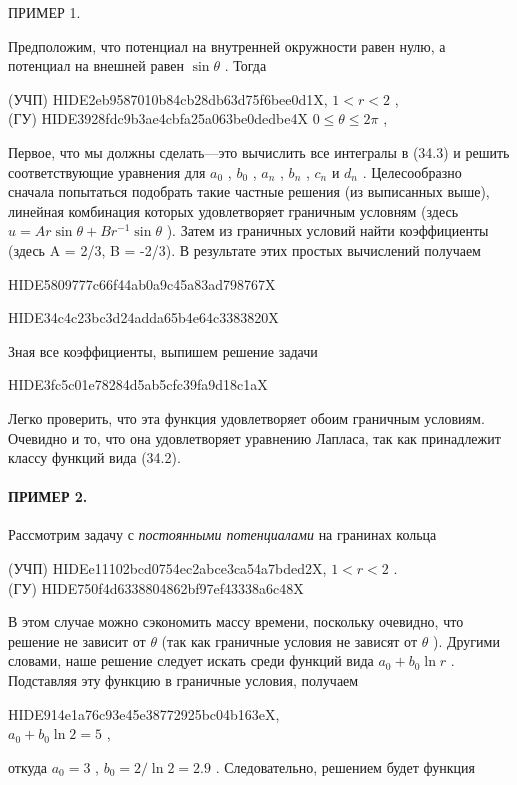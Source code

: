 \documentclass[
  ukrainian,
]{article}
\begin{document}
ПРИМЕР 1.

Предположим, что потенциал на внутренней окружности равен нулю, а
потенциал на внешней равен \(\sin\theta\) . Тогда

(УЧП) HIDE2eb9587010b84cb28db63d75f6bee0d1X, \(1 < r < 2\) ,\\
(ГУ) HIDE3928fdc9b3ae4cbfa25a063be0dedbe4X \(0 \le \theta \le 2\pi\) ,

Первое, что мы должны сделать---это вычислить все интегралы в (34.3) и
решить соответствующие уравнения для \(a_0\) , \(b_0\) , \(a_n\) ,
\(b_n\) , \(c_n\) и \(d_n\) . Целесообразно сначала попытаться подобрать
такие частные решения (из выписанных выше), линейная комбинация которых
удовлетворяет граничным условням (здесь
\(u = Ar \sin \theta + Br^{-1} \sin \theta\) ). Затем из граничных
условий найти коэффициенты (здесь A = 2/3, B = -2/3). В результате этих
простых вычислений получаем

HIDE5809777c66f44ab0a9c45a83ad798767X

HIDE34c4c23bc3d24adda65b4e64c3383820X

Зная все коэффициенты, выпишем решение задачи

HIDE3fc5c01e78284d5ab5cfc39fa9d18c1aX

Легко проверить, что эта функция удовлетворяет обоим граничным условиям.
Очевидно и то, что она удовлетворяет уравнению Лапласа, так как
принадлежит классу функций вида (34.2).

\paragraph{ПРИМЕР 2.}\label{ux43fux440ux438ux43cux435ux440-2.}

Рассмотрим задачу с \emph{постоянными потенциалами} на гранинах кольца

(УЧП) HIDEe11102bcd0754ec2abce3ca54a7bded2X, \(1 < r < 2\) .\\
(ГУ) HIDE750f4d6338804862bf97ef43338a6c48X

В этом случае можно сэкономить массу времени, поскольку очевидно, что
решение не зависит от \(\theta\) (так как граничные условия не зависят
от \(\theta\) ). Другими словами, наше решение следует искать среди
функций вида \(a_0 + b_0 \ln r\) . Подставляя эту функцию в граничные
условия, получаем

HIDE914e1a76c93e45e38772925bc04b163eX,\\
\(a_0 + b_0 \ln 2 = 5\) ,

откуда \(a_0 = 3\) , \(b_0 = 2/\ln 2 = 2.9\) . Следовательно, решением
будет функция
\end{document}
